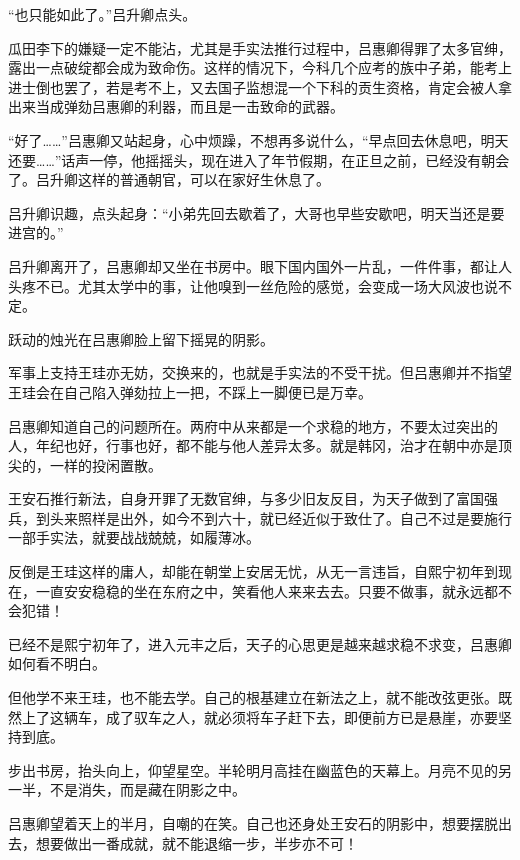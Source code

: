 “也只能如此了。”吕升卿点头。

瓜田李下的嫌疑一定不能沾，尤其是手实法推行过程中，吕惠卿得罪了太多官绅，露出一点破绽都会成为致命伤。这样的情况下，今科几个应考的族中子弟，能考上进士倒也罢了，若是考不上，又去国子监想混一个下科的贡生资格，肯定会被人拿出来当成弹劾吕惠卿的利器，而且是一击致命的武器。

“好了……”吕惠卿又站起身，心中烦躁，不想再多说什么，“早点回去休息吧，明天还要……”话声一停，他摇摇头，现在进入了年节假期，在正旦之前，已经没有朝会了。吕升卿这样的普通朝官，可以在家好生休息了。

吕升卿识趣，点头起身：“小弟先回去歇着了，大哥也早些安歇吧，明天当还是要进宫的。”

吕升卿离开了，吕惠卿却又坐在书房中。眼下国内国外一片乱，一件件事，都让人头疼不已。尤其太学中的事，让他嗅到一丝危险的感觉，会变成一场大风波也说不定。

跃动的烛光在吕惠卿脸上留下摇晃的阴影。

军事上支持王珪亦无妨，交换来的，也就是手实法的不受干扰。但吕惠卿并不指望王珪会在自己陷入弹劾拉上一把，不踩上一脚便已是万幸。

吕惠卿知道自己的问题所在。两府中从来都是一个求稳的地方，不要太过突出的人，年纪也好，行事也好，都不能与他人差异太多。就是韩冈，治才在朝中亦是顶尖的，一样的投闲置散。

王安石推行新法，自身开罪了无数官绅，与多少旧友反目，为天子做到了富国强兵，到头来照样是出外，如今不到六十，就已经近似于致仕了。自己不过是要施行一部手实法，就要战战兢兢，如履薄冰。

反倒是王珪这样的庸人，却能在朝堂上安居无忧，从无一言违旨，自熙宁初年到现在，一直安安稳稳的坐在东府之中，笑看他人来来去去。只要不做事，就永远都不会犯错！

已经不是熙宁初年了，进入元丰之后，天子的心思更是越来越求稳不求变，吕惠卿如何看不明白。

但他学不来王珪，也不能去学。自己的根基建立在新法之上，就不能改弦更张。既然上了这辆车，成了驭车之人，就必须将车子赶下去，即便前方已是悬崖，亦要坚持到底。

步出书房，抬头向上，仰望星空。半轮明月高挂在幽蓝色的天幕上。月亮不见的另一半，不是消失，而是藏在阴影之中。

吕惠卿望着天上的半月，自嘲的在笑。自己也还身处王安石的阴影中，想要摆脱出去，想要做出一番成就，就不能退缩一步，半步亦不可！

